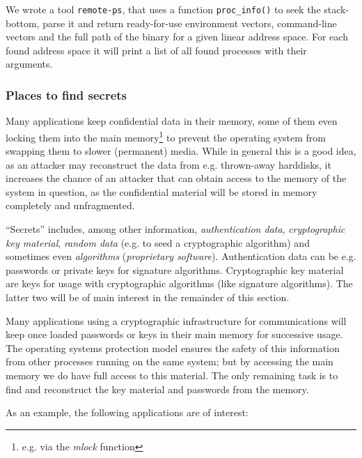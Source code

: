 We wrote a tool \texttt{remote-ps}, that uses a function \texttt{proc\_info()}
to seek the stack-bottom, parse it and return ready-for-use environment vectors,
command-line vectors and the full path of the binary for a given linear address
space.  For each found address space it will print a list of all found processes
with their arguments.



\subsubsection{Places to find secrets}

Many applications keep confidential data in their memory, some of them even
locking them into the main memory\footnote{e.g\@. via the \emph{mlock} function}
to prevent the operating system from swapping them to slower (permanent) media.
While in general this is a good idea, as an attacker may reconstruct the data
from e.g\@. thrown-away harddisks, it increases the chance of an attacker that
can obtain access to the memory of the system in question, as the confidential
material will be stored in memory completely and unfragmented.

``Secrets'' includes, among other information, \emph{authentication data},
\emph{cryptographic key material}, \emph{random data} (e.g\@. to seed a
cryptographic algorithm) and sometimes even \emph{algorithms} (\emph{proprietary
software}). Authentication data can be e.g\@. passwords or private keys for
signature algorithms. Cryptographic key material are keys for usage with
cryptographic algorithms (like signature algorithms). The latter two will be of
main interest in the remainder of this section.

Many applications using a cryptographic infrastructure for communications will
keep once loaded passwords or keys in their main memory for successive usage.
The operating systems protection model ensures the safety of this information
from other processes running on the same system; but by accessing the main
memory we do have full access to this material. The only remaining task is to
find and reconstruct the key material and passwords from the memory.

As an example, the following applications are of interest:

